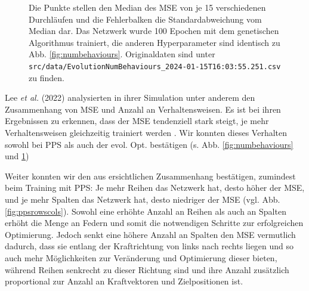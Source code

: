 \documentclass[10pt]{scrartcl}
\newcommand{\filepath}[1]{\texttt{#1}}
\newcommand{\lee}{Lee {\itshape et al.} (2022)}
\begin{document}
\begin{figure}[H]
    \centering
    \Data
    \caption{Die Punkte stellen den Median des MSE von je 15 verschiedenen Durchläufen und die Fehlerbalken die Standardabweichung vom Median dar. Das Netzwerk wurde 100 Epochen mit dem genetischen Algorithmus trainiert, die anderen Hyperparameter sind identisch zu Abb. \ref{fig:numbehaviours}. Originaldaten sind unter \filepath{src/data/EvolutionNumBehaviours\_2024-01-15T16:03:55.251.csv} zu finden.}
    \label{fig:numbehavioursevolution}
\end{figure}


\lee{} analysierten in ihrer Simulation unter anderem den Zusammenhang von MSE und Anzahl an Verhaltensweisen.
Es ist bei ihren Ergebnissen zu erkennen, dass der MSE tendenziell stark steigt, je mehr Verhaltensweisen gleichzeitig trainiert werden \cite[Abb. 5A u. 5C]{Lee2022}.
Wir konnten dieses Verhalten sowohl bei PPS als auch der evol. Opt. bestätigen (s. Abb. \ref{fig:numbehaviours} und \ref{fig:numbehavioursevolution})

Weiter konnten wir den aus \cite[Abb. 5B]{Lee2022} ersichtlichen Zusammenhang bestätigen, zumindest beim Training mit PPS:
Je mehr Reihen das Netzwerk hat, desto höher der MSE, und je mehr Spalten das Netzwerk hat, desto niedriger der MSE (vgl. Abb. \ref{fig:ppsrowscols}).
Sowohl eine erhöhte Anzahl an Reihen als auch an Spalten erhöht die Menge an Federn und somit die notwendigen Schritte zur erfolgreichen Optimierung. Jedoch senkt eine höhere Anzahl an Spalten den MSE vermutlich dadurch, dass sie entlang der Kraftrichtung von links nach rechts liegen und so auch mehr Möglichkeiten zur Veränderung und Optimierung dieser bieten, während Reihen senkrecht zu dieser Richtung sind und ihre Anzahl zusätzlich proportional zur Anzahl an Kraftvektoren und Zielpositionen ist.
\end{document}
